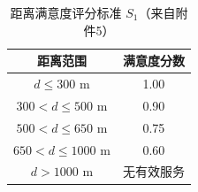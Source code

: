 \begin{table}[h]
\centering
\caption{距离满意度评分标准 $S_1$（来自附件5）}
\begin{tabular}{|c|c|}
\hline
距离范围 & 满意度分数 \\
\hline
$d \leq 300$ m & 1.00 \\
$300 < d \leq 500$ m & 0.90 \\
$500 < d \leq 650$ m & 0.75 \\
$650 < d \leq 1000$ m & 0.60 \\
$d > 1000$ m & 无有效服务 \\
\hline
\end{tabular}
\end{table}